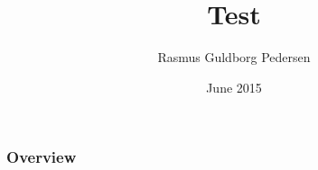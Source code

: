 \documentclass{beamer}
\title[Test]{Test}
\author{Rasmus Guldborg Pedersen}
\date{June 2015}
\begin{document}
\begin{frame}
\titlepage
\end{frame}

\begin{frame}
\frametitle{Overview}
\tableofcontents
\end{frame}
\end{document}
